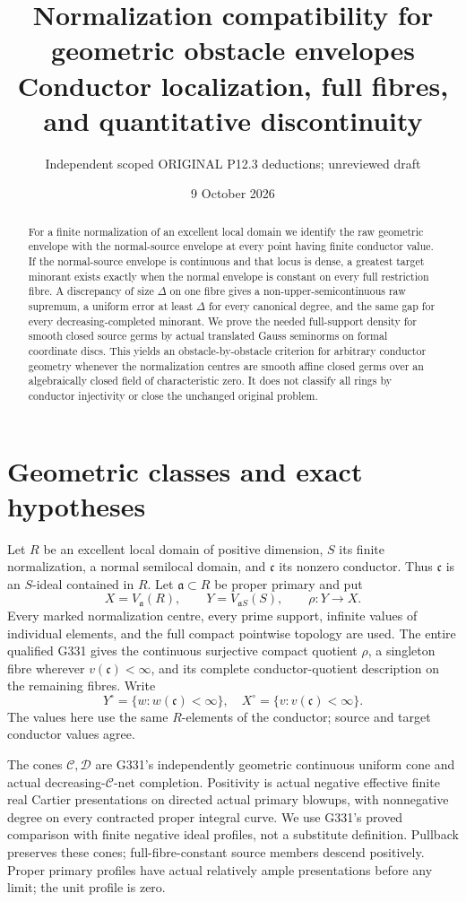 \documentclass[11pt]{article}
\title{Normalization compatibility for geometric obstacle envelopes\\
Conductor localization, full fibres, and quantitative discontinuity}
\author{Independent scoped ORIGINAL P12.3 deductions; unreviewed draft}
\date{9 October 2026}
\newcommand{\C}{\mathcal C}
\newcommand{\D}{\mathcal D}
\newcommand{\aa}{\mathfrak a}
\begin{document}
\maketitle
\begin{abstract}
For a finite normalization of an excellent local domain we identify the
raw geometric envelope with the normal-source envelope at every point
having finite conductor value. If the normal-source envelope is continuous
and that locus is dense, a greatest target minorant exists exactly when
the normal envelope is constant on every full restriction fibre.
A discrepancy of size $\Delta$ on one fibre gives a non-upper-semicontinuous
raw supremum, a uniform error at least $\Delta$ for every canonical degree,
and the same gap for every decreasing-completed minorant. We prove the
needed full-support density for smooth closed source germs by actual
translated Gauss seminorms on formal coordinate discs. This yields an
obstacle-by-obstacle criterion for arbitrary conductor geometry whenever
the normalization centres are smooth affine closed germs over an
algebraically closed field of characteristic zero. It does not classify
all rings by conductor injectivity or close the unchanged original problem.
\end{abstract}

\section{Geometric classes and exact hypotheses}
Let $R$ be an excellent local domain of positive dimension, $S$ its finite
normalization, a normal semilocal domain, and $\mathfrak c$ its nonzero
conductor. Thus $\mathfrak c$ is an $S$-ideal contained in $R$.
Let $\aa\subset R$ be proper primary and put
\[
 X=V_{\aa}(R),\qquad Y=V_{\aa S}(S),\qquad \rho:Y\longrightarrow X.
\]
Every marked normalization centre, every prime support, infinite values
of individual elements, and the full compact pointwise topology are used.
The entire qualified G331 gives the continuous surjective compact quotient
$\rho$, a singleton fibre wherever $v(\mathfrak c)<\infty$, and its complete
conductor-quotient description on the remaining fibres.
Write
\[
 Y^\circ=\{w:w(\mathfrak c)<\infty\},\quad
 X^\circ=\{v:v(\mathfrak c)<\infty\}.
\]
The values here use the same $R$-elements of the conductor; source and
target conductor values agree.

The cones $\C,\D$ are G331's independently geometric continuous uniform
cone and actual decreasing-$\C$-net completion. Positivity is actual
negative effective finite real Cartier presentations on directed actual
primary blowups, with nonnegative degree on every contracted proper
integral curve. We use G331's proved comparison with finite negative ideal
profiles, not a substitute definition. Pullback preserves these cones;
full-fibre-constant source members descend positively. Proper primary
profiles have actual relatively ample presentations before any limit;
the unit profile is zero.
\end{document}
